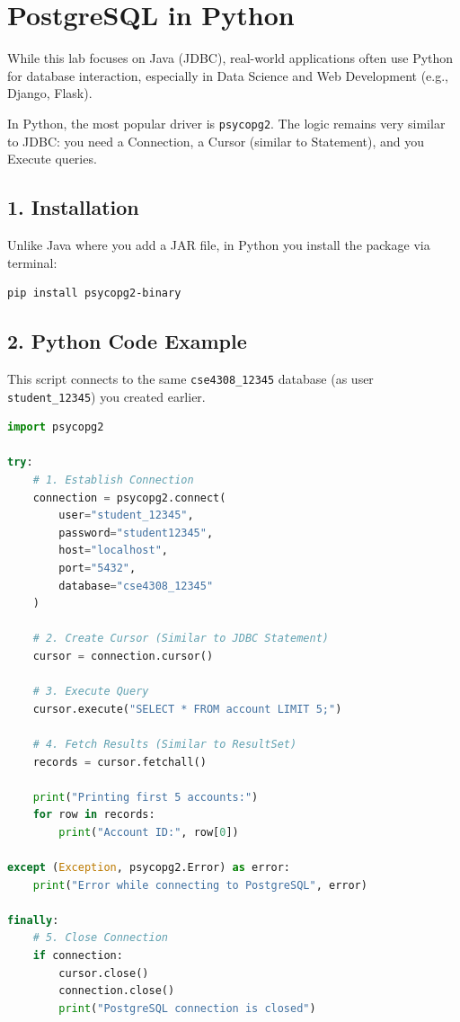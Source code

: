 \documentclass[12pt,a4paper]{article}
\begin{document}
\newpage
\section{PostgreSQL in Python}

While this lab focuses on Java (JDBC), real-world applications often use Python for database interaction, especially in Data Science and Web Development (e.g., Django, Flask). 

In Python, the most popular driver is \texttt{psycopg2}. The logic remains very similar to JDBC: you need a Connection, a Cursor (similar to Statement), and you Execute queries.

\subsection{1. Installation}
Unlike Java where you add a JAR file, in Python you install the package via terminal:
\begin{lstlisting}[language=bash]
pip install psycopg2-binary
\end{lstlisting}

\subsection{2. Python Code Example}
This script connects to the same \texttt{cse4308\_12345} database (as user \texttt{student\_12345}) you created earlier.

\begin{lstlisting}[language=Python]
import psycopg2

try:
    # 1. Establish Connection
    connection = psycopg2.connect(
        user="student_12345",
        password="student12345",
        host="localhost",
        port="5432",
        database="cse4308_12345"
    )

    # 2. Create Cursor (Similar to JDBC Statement)
    cursor = connection.cursor()

    # 3. Execute Query
    cursor.execute("SELECT * FROM account LIMIT 5;")

    # 4. Fetch Results (Similar to ResultSet)
    records = cursor.fetchall()
    
    print("Printing first 5 accounts:")
    for row in records:
        print("Account ID:", row[0])

except (Exception, psycopg2.Error) as error:
    print("Error while connecting to PostgreSQL", error)

finally:
    # 5. Close Connection
    if connection:
        cursor.close()
        connection.close()
        print("PostgreSQL connection is closed")
\end{lstlisting}

\end{document}
